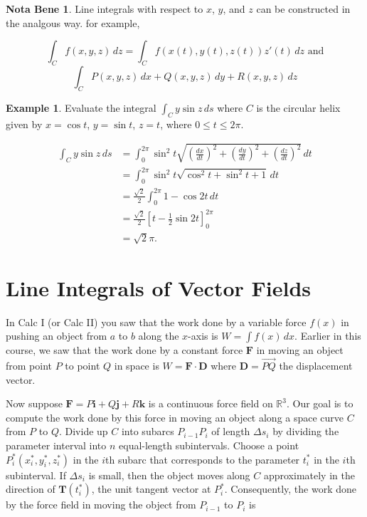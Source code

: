 \documentclass[11pt,oneside,english]{amsart}
\theoremstyle{definition}
\newtheorem*{example}{Example}
\newtheorem*{note}{Nota Bene}
\newcommand{\R}{\mathbb{R}}
\newcommand{\dd}[2]{\frac{d{#1}}{d{#2}}}
\newcommand{\ovec}[1]{\overrightarrow{#1}}
\begin{document}
\begin{note}
Line integrals with respect to $x$, $y$, and $z$ can be constructed in the analgous way. for example,

\[
\int_Cf(x,y,z)\,dz=\int_Cf(x(t),y(t),z(t))z'(t)\,dz\text{ and}
\]
\[
\int_CP(x,y,z)\,dx+Q(x,y,z)\,dy+R(x,y,z)\,dz
\]

\end{note}


\begin{example}
Evaluate the integral $\displaystyle \int_Cy\sin z\,ds$ where $C$ is the circular helix given by $x=\cos t$, $y=\sin t$, $z=t$, where $0\leq t\leq 2\pi$.

\begin{align*}
\int_Cy\sin z\,ds&=\int_0^{2\pi}\sin^2t \sqrt{\left(\dd{x}{t}\right)^2+\left(\dd{y}{t}\right)^2+\left(\dd{z}{t}\right)^2}\,dt\\[2mm]
&=\int_0^{2\pi}\sin^2t \sqrt{\cos^2t+\sin^2t+1}\,dt\\[2mm]
&=\frac{\sqrt{2}}{2}\int_0^{2\pi}1-\cos2t\,dt\\[2mm]
&=\frac{\sqrt{2}}{2}\left[t-\frac{1}{2}\sin2t\right]_0^{2\pi}\\[2mm]
&=\sqrt{2}\pi.
\end{align*}
\end{example}


\section*{Line Integrals of Vector Fields}

In Calc I (or Calc II) you saw that the work done by a variable force $f(x)$ in pushing an object from $a$ to $b$ along the $x$-axis is $\displaystyle W=\int f(x)\,dx$. Earlier in this course, we saw that the work done by a constant force $\mathbf{F}$ in moving an object from point $P$ to point $Q$ in space is $W=\mathbf{F}\cdot\mathbf{D}$ where $\mathbf{D}=\ovec{PQ}$ the displacement vector.

\pagebreak

Now suppose $\mathbf{F}=P\mathbf{i}+Q\mathbf{j}+R\mathbf{k}$ is a continuous force field on $\R^3$. Our goal is to compute the work done by this force in moving an object along a space curve $C$ from $P$ to $Q$. Divide up $C$ into subarcs $P_{i-1}P_i$ of length $\Delta s_i$ by dividing the parameter interval into $n$ equal-length subintervals. Choose a point $P_i^*(x_i^*,y_i^*,z_i^*)$ in the $i$th subarc that corresponds to the parameter $t_i^*$ in the $i$th subinterval. If $\Delta s_i$ is small, then the object moves along $C$ approximately in the direction of $\mathbf{T}(t_i^*)$, the unit tangent vector at $P_i^*$. Consequently, the work done by the force field in moving the object from $P_{i-1}$ to $P_i$ is
\end{document}
